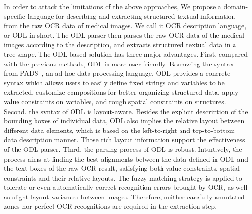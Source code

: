 In order to attack the limitations of the above approaches,
We propose a domain-specific language for describing and extracting
structured textual information from the raw OCR data of medical images.
We call it OCR description language, or ODL in short.
The ODL parser then parses the raw OCR data
of the medical images according to the description,
and extracts structured textual data in a tree shape.
The ODL based solution has three major advantages.
First, compared with the previous methods, ODL is more user-friendly.
Borrowing the syntax from PADS~\cite{fisher2005pads},
an ad-hoc data processing language,
ODL provides a concrete syntax which allows users to easily define
fixed strings and variables to be extracted,
customize compositions for better organizing structured data,
apply value constraints on variables, and rough spatial constraints on structures.
Second, the syntax of ODL is layout-aware.
Besides the explicit description of the bounding boxes of individual data,
ODL also implies the relative layout between different data elements,
which is based on the left-to-right and top-to-bottom data description manner.
Those rich layout information support the effectiveness of the ODL parser.
Third, the parsing process of ODL is robust.
Intuitively, the process aims at finding the best alignments
between the data defined in ODL and the text boxes of the raw OCR result,
satisfying both value constraints,
spatial constraints and their relative layouts.
The fuzzy matching strategy is applied to tolerate
or even automatically correct recognition errors brought by OCR,
as well as slight layout variances between images.
Therefore, neither carefully annotated zones nor
perfect OCR recognitions are required in the extraction step.



